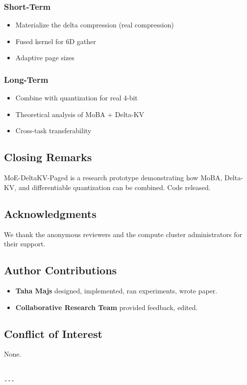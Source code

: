 \subsubsection{Short-Term}
\begin{itemize}
\item Materialize the delta compression (real compression)
\item Fused kernel for 6D gather
\item Adaptive page sizes

\end{itemize}
\subsubsection{Long-Term}
\begin{itemize}
\item Combine with quantization for real 4-bit
\item Theoretical analysis of MoBA + Delta-KV
\item Cross-task transferability

\end{itemize}
\subsection{Closing Remarks}

MoE-DeltaKV-Paged is a research prototype demonstrating how MoBA, Delta-KV, 
and differentiable quantization can be combined. Code released.

\subsection{Acknowledgments}

We thank the anonymous reviewers and the compute cluster administrators for their support.

\subsection{Author Contributions}

\begin{itemize}
\item \textbf{Taha Majs} designed, implemented, ran experiments, wrote paper.
\item \textbf{Collaborative Research Team} provided feedback, edited.

\end{itemize}
\subsection{Conflict of Interest}

None.
\begin{lstlisting}

---
\end{lstlisting}